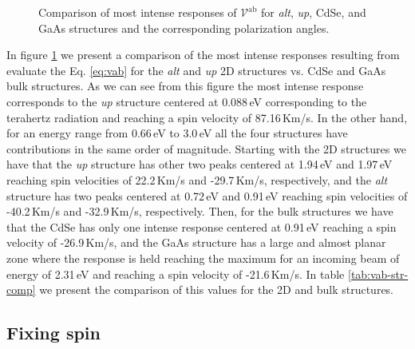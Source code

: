 \documentclass[prb,11pt,tightenlines,twocolumn,aps]{revtex4-1}
\begin{document}
{\begin{figure}[t]
    \caption{Comparison of most intense responses of $\mathcal{V}^{\mathrm{ab}}$
    for \emph{alt}, \emph{up}, CdSe, and GaAs structures and the corresponding
    polarization angles.}
    \label{fig:vab-str-comp}
\end{figure}

In figure \ref{fig:vab-str-comp} we present a comparison of the most intense
responses resulting from evaluate the Eq. \eqref{eq:vab} for the \emph{alt} and
\emph{up} 2D structures vs. CdSe and GaAs bulk structures. As we can see from
this figure the most intense response corresponds to the \emph{up} structure
centered at 0.088\,eV corresponding to the terahertz radiation and reaching a
spin velocity of 87.16\,Km/s.
% 
In the other hand, for an energy range from 0.66\,eV to 3.0\,eV all the
four structures have contributions in the same order of magnitude. 
% 
Starting with the 2D structures we have that the \emph{up} structure has other
two peaks centered at 1.94\,eV and 1.97\,eV reaching spin velocities of
22.2\,Km/s and -29.7\,Km/s, respectively, and the \emph{alt} structure has two
peaks centered at 0.72\,eV and 0.91\,eV reaching spin velocities of -40.2\,Km/s
and -32.9\,Km/s, respectively.
% 
Then, for the bulk structures we have that the CdSe has only one intense
response centered at 0.91\,eV reaching a spin velocity of -26.9\,Km/s, and the
GaAs structure has a large and almost planar zone where the response is held
reaching the maximum for an incoming beam of energy of 2.31\,eV and reaching a
spin velocity of -21.6\,Km/s.
% 
In table \ref{tab:vab-str-comp} we present the comparison of this values for the
2D and bulk structures.
% 
} %




\subsection{Fixing spin} %
\label{sec:res-fixspin}


\end{document}
